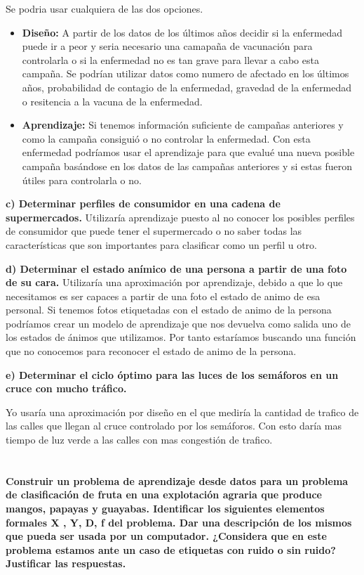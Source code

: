 \documentclass[titlepage]{article}
\begin{document}
	Se podria usar cualquiera de las dos opciones.
	\begin{itemize}
		\item \textbf{Diseño: } A partir de los datos de los últimos años decidir si la enfermedad puede ir a peor y seria necesario una camapaña de vacunación para controlarla o si la enfermedad no es tan grave para llevar a cabo esta campaña. Se podrían utilizar datos como numero de afectado en los últimos años, probabilidad de contagio de la enfermedad, gravedad de la enfermedad o resitencia a la vacuna de la enfermedad. 
		
		\item \textbf{Aprendizaje: } Si tenemos información suficiente de campañas anteriores y como la campaña consiguió o no controlar la enfermedad. Con esta enfermedad podríamos usar el aprendizaje para que evalué una nueva posible campaña basándose en los datos de las campañas anteriores y si estas fueron útiles para controlarla o no.
		
		
	\end{itemize}

 	
  	\textbf{c) Determinar perfiles de consumidor en una cadena de supermercados.}
  	\newline
  	Utilizaría aprendizaje puesto al no conocer los posibles perfiles de consumidor que puede tener el supermercado o no saber todas las características que son importantes para clasificar como un perfil u otro.
  	
  	\textbf{d) Determinar el estado anímico de una persona a partir de una foto de su cara.}
  	Utilizaría una aproximación por aprendizaje, debido a que lo que necesitamos es ser capaces a partir de una foto el estado de animo de esa personal. Si tenemos fotos etiquetadas con el estado de animo de la persona podríamos crear un modelo de aprendizaje que nos devuelva como salida uno de los estados de ánimos que utilizamos. Por tanto estaríamos buscando una función que no conocemos para reconocer el estado de animo de la persona.
  	\newline
  	
  	\textbf{e) Determinar el ciclo óptimo para las luces de los semáforos en un cruce con mucho tráfico.}
  	
  	Yo usaría una aproximación por diseño en el que mediría la cantidad de trafico de las calles que llegan al cruce controlado por los semáforos. Con esto daría mas tiempo de luz verde a las calles con mas congestión de trafico.
  	
  	\newpage
  	\section{}
  	\textbf{Construir un problema de aprendizaje desde datos para un problema de clasificación de
  	fruta en una explotación agraria que produce mangos, papayas y guayabas. Identificar los
  	siguientes elementos formales X , Y, D, f del problema. Dar una descripción de los mismos
  	que pueda ser usada por un computador. ¿Considera que en este problema estamos ante
  	un caso de etiquetas con ruido o sin ruido? Justificar las respuestas.}
  
\end{document}
